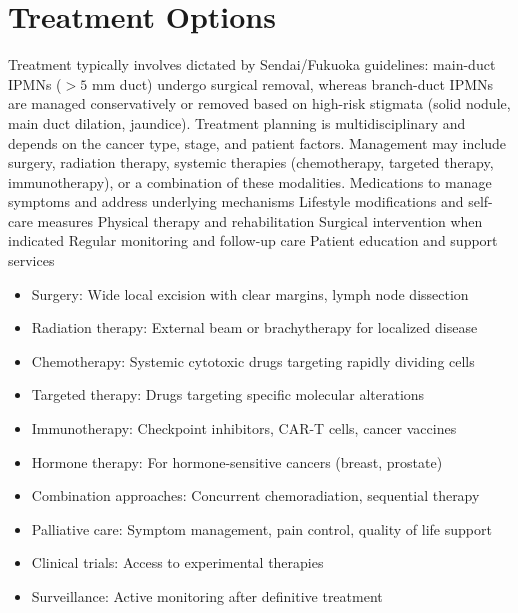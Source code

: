 \section{Treatment Options}
Treatment typically involves dictated by Sendai/Fukuoka guidelines: main-duct IPMNs ($>5$ mm duct) undergo surgical removal, whereas branch-duct IPMNs are managed conservatively or removed based on high-risk stigmata (solid nodule, main duct dilation, jaundice). Treatment planning is multidisciplinary and depends on the cancer type, stage, and patient factors. Management may include surgery, radiation therapy, systemic therapies (chemotherapy, targeted therapy, immunotherapy), or a combination of these modalities. Medications to manage symptoms and address underlying mechanisms Lifestyle modifications and self-care measures Physical therapy and rehabilitation Surgical intervention when indicated Regular monitoring and follow-up care Patient education and support services

\begin{itemize}[noitemsep]
  \item Surgery: Wide local excision with clear margins, lymph node dissection
  \item Radiation therapy: External beam or brachytherapy for localized disease
  \item Chemotherapy: Systemic cytotoxic drugs targeting rapidly dividing cells
  \item Targeted therapy: Drugs targeting specific molecular alterations
  \item Immunotherapy: Checkpoint inhibitors, CAR-T cells, cancer vaccines
  \item Hormone therapy: For hormone-sensitive cancers (breast, prostate)
  \item Combination approaches: Concurrent chemoradiation, sequential therapy
  \item Palliative care: Symptom management, pain control, quality of life support
  \item Clinical trials: Access to experimental therapies
  \item Surveillance: Active monitoring after definitive treatment
\end{itemize}
